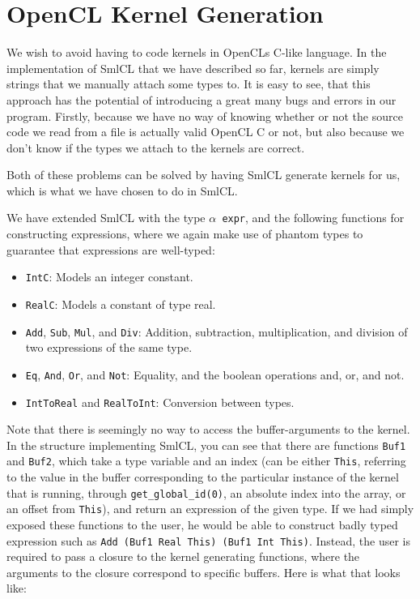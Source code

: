 \section{OpenCL Kernel Generation}
\label{kerngen}

We wish to avoid having to code kernels in OpenCLs C-like language. In
the implementation of SmlCL that we have described so far, kernels are
simply strings that we manually attach some types to. It is easy to
see, that this approach has the potential of introducing a great many
bugs and errors in our program. Firstly, because we have no way of
knowing whether or not the source code we read from a file is actually
valid OpenCL C or not, but also because we don't know if the types
we attach to the kernels are correct.

Both of these problems can be solved by having SmlCL generate kernels
for us, which is what we have chosen to do in SmlCL.

We have extended SmlCL with the type \texttt{$\alpha$ expr}, and the
following functions for constructing expressions, where we again make
use of phantom types to guarantee that expressions are well-typed:

\begin{itemize}
  \item \texttt{IntC}: Models an integer constant.
  \item \texttt{RealC}: Models a constant of type real.
  \item \texttt{Add}, \texttt{Sub}, \texttt{Mul}, and \texttt{Div}:
    Addition, subtraction, multiplication, and division of two expressions of the same type.
  \item \texttt{Eq}, \texttt{And}, \texttt{Or}, and \texttt{Not}:
    Equality, and the boolean operations and, or, and not.
  \item \texttt{IntToReal} and \texttt{RealToInt}: Conversion between
    types.
\end{itemize}

Note that there is seemingly no way to access the buffer-arguments to
the kernel. In the structure implementing SmlCL, you can see that
there are functions \texttt{Buf1} and
\texttt{Buf2}, which take a type variable and an index (can be either
\texttt{This}, referring to the value in the buffer corresponding to
the particular instance of the kernel that is running, through
\texttt{get\_global\_id(0)}, an absolute index into the array, or an
offset from \texttt{This}), and return an expression of the given
type. If we had simply exposed these functions to the user, he would
be able to construct badly typed expression such as \texttt{Add (Buf1
  Real This) (Buf1 Int This)}. Instead, the user is required to pass a
closure to the kernel generating functions, where the arguments to the
closure correspond to specific buffers. Here is what that looks
like:

